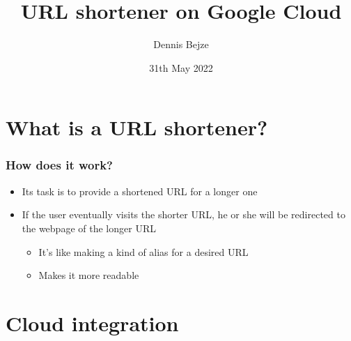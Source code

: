 \documentclass[aspectratio=169,16pt]{beamer}
\begin{document}
\title{URL shortener on Google Cloud}
\author{Dennis Bejze}
\date{31th May 2022}

\maketitle


\section{What is a URL shortener?}

\begin{frame}
    \frametitle{How does it work?}

    \begin{itemize}
        \item Its task is to provide a shortened URL for a longer one
        \item If the user eventually visits the shorter URL, he or she will be redirected to
              the webpage of the longer URL
              \begin{itemize}
                  \item It's like making a kind of alias for a desired URL
                  \item Makes it more readable
              \end{itemize}
    \end{itemize}
\end{frame}

\section{Cloud integration}
\end{document}
